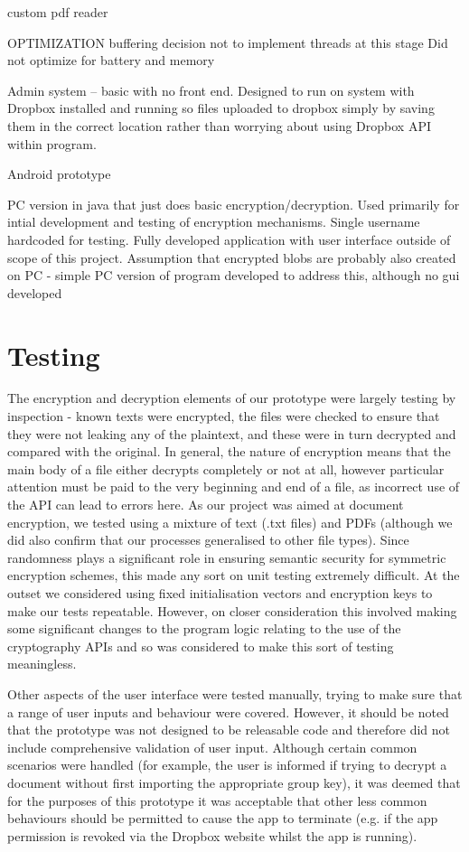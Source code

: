 custom pdf reader

OPTIMIZATION
buffering
decision not to implement threads at this stage
Did not optimize for battery and memory



Admin system – basic with no front end.  Designed to run on system with Dropbox installed and running so files uploaded to dropbox simply by saving them in the correct location rather than worrying about using Dropbox API within program.

Android prototype

PC version in java that just does basic encryption/decryption.  Used primarily for intial development and testing of encryption mechanisms. Single username hardcoded for testing. Fully developed application with user interface outside of scope of this project. Assumption that encrypted blobs are probably also created on PC - simple PC version of program developed to address this, although no gui developed
\section{Testing}

The encryption and decryption elements of our prototype were largely testing by inspection - known texts were encrypted, the files were checked to ensure that they were not leaking any of the plaintext, and these were in turn decrypted and compared with the original.   In general, the nature of encryption means that the main body of a file either decrypts completely or not at all, however particular attention must be paid to the very beginning and end of a file, as incorrect use of the API can lead to errors here.  As our project was aimed at document encryption, we tested using a mixture of text (.txt files) and PDFs (although we did also confirm that our processes generalised to other file types).  Since randomness plays a significant role in ensuring  semantic security  for symmetric encryption schemes, this made any sort on unit testing extremely difficult.  At the outset we considered using fixed initialisation vectors and encryption keys to make our tests repeatable.  However, on closer consideration this involved making some significant changes to the program logic relating to the use of the cryptography APIs and so was considered to make this sort of testing meaningless.  

Other aspects of the user interface were tested manually, trying to make sure that a range of user inputs and behaviour were covered.  However, it should be noted that the prototype was not designed to be releasable code and therefore did not include comprehensive validation of user input. Although certain common scenarios were handled (for example, the user is informed if trying to decrypt a document without first importing the appropriate group key), it was deemed that for the purposes of this prototype it was acceptable that other less common behaviours should be permitted to cause the app to terminate (e.g. if the app permission is revoked via the Dropbox website whilst the app is running).  

